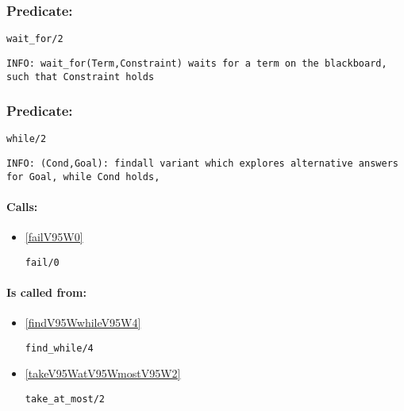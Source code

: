 \subsubsection{Predicate:} \label{waitV95WforV95W2}

\begin{verbatim}
wait_for/2
\end{verbatim}

{\small \begin{verbatim}
INFO: wait_for(Term,Constraint) waits for a term on the blackboard, such that Constraint holds

\end{verbatim}}

\subsubsection{Predicate:} \label{whileV95W2}

\begin{verbatim}
while/2
\end{verbatim}

{\small \begin{verbatim}
INFO: (Cond,Goal): findall variant which explores alternative answers for Goal, while Cond holds, 

\end{verbatim}}
\paragraph{Calls:} 
\begin{itemize}
\item \ref{failV95W0} 
\begin{verbatim}
fail/0
\end{verbatim}

\end{itemize}
\paragraph{Is called from:} 
\begin{itemize}
\item \ref{findV95WwhileV95W4} 
\begin{verbatim}
find_while/4
\end{verbatim}

\item \ref{takeV95WatV95WmostV95W2} 
\begin{verbatim}
take_at_most/2
\end{verbatim}

\end{itemize}

